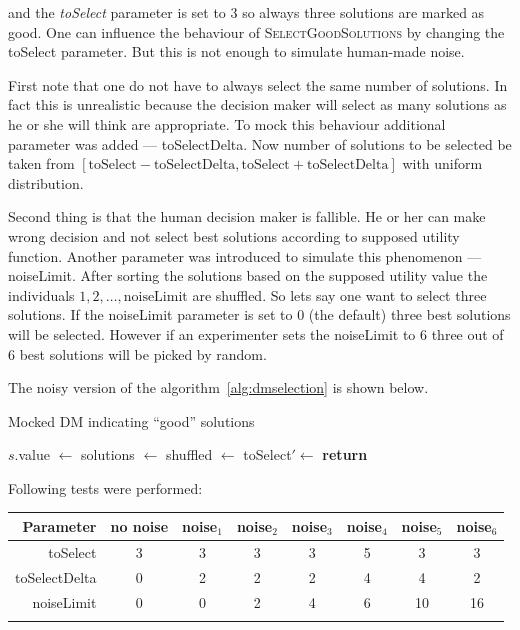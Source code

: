 and the \textit{toSelect} parameter is set to $3$ so always three solutions
are marked as good. One can influence the behaviour of
\textsc{SelectGoodSolutions} by changing the toSelect parameter. But this is
not enough to simulate human-made noise.

First note that one do not have to always select the same number of
solutions. In fact this is unrealistic because the decision maker will select
as many solutions as he or she will think are appropriate. To mock this
behaviour additional parameter was added --- toSelectDelta. Now number of
solutions to be selected be taken from $[\text{toSelect} -
  \text{toSelectDelta}, \text{toSelect} + \text{toSelectDelta}]$ with uniform
distribution.

Second thing is that the human decision maker is fallible. He or her can make
wrong decision and not select best solutions according to supposed utility
function. Another parameter was introduced to simulate this phenomenon ---
noiseLimit. After sorting the solutions based on the supposed utility value
the individuals $1, 2, \dots, \text{noiseLimit}$ are shuffled. So lets say one
want to select three solutions. If the noiseLimit parameter is set to $0$ (the
default) three best solutions will be selected. However if an experimenter
sets the noiseLimit to $6$ three out of $6$ best solutions will be picked by
random.

The noisy version of the algorithm~\ref{alg:dmselection} is shown below.
\begin{algorithm}
\caption{Mocked DM indicating ``good'' solutions}\label{alg:noisydmselection}
  \begin{algorithmic}[1]
    \State $s.$value $\gets$ 
    \EndFor
    \State solutions $\gets$ 
    \State shuffled $\gets$ 
    \State toSelect$' \gets$ 
    \State \textbf{return} 
    \EndProcedure
  \end{algorithmic}
\end{algorithm}

Following tests were performed:

\begin{tabular}{r c c c c c c c}
  \hline
  Parameter & no noise & noise$_1$ & noise$_2$ & noise$_3$ & noise$_4$ &
  noise$_5$ & noise$_6$ \\
  \hline
  \hline
  toSelect      & 3 & 3 & 3 & 3 & 5 &  3 &  3 \\
  toSelectDelta & 0 & 2 & 2 & 2 & 4 &  4 &  2 \\
  noiseLimit    & 0 & 0 & 2 & 4 & 6 & 10 & 16 \\
  \hline \\
\end{tabular}

